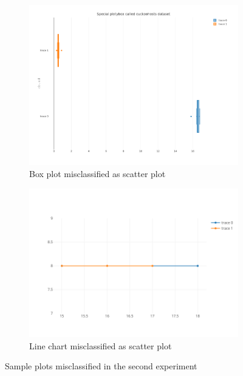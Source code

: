 \documentclass[12pt, a4paper,oneside]{report}
\begin{document}
\begin{figure}[!htb]
	\begin{subfigure}{.6\textwidth}
		\centering
		\includegraphics[width=.8\linewidth]{missyscatter.png}
		\caption{Box plot misclassified as scatter plot}
		\label{fig:mis1}
	\end{subfigure}%
	\begin{subfigure}{.5\textwidth}
		\centering
		\includegraphics[width=1.0\linewidth]{missyscatter2.png}
		\caption{Line chart misclassified as scatter plot}
		\label{fig:mis2}
	\end{subfigure}
	\caption{Sample plots misclassified in the second experiment}
	\label{fig:missrand}
\end{figure}
\end{document}
